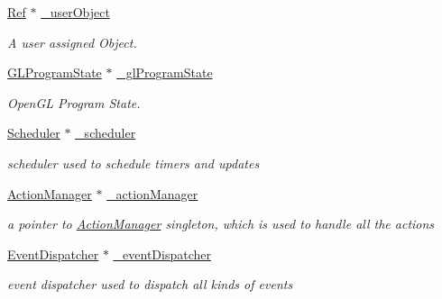 \begin{DoxyCompactItemize}
\hyperlink{classRef}{Ref} $\ast$ \hyperlink{classNode_a0c483cd6aa6c7f516b332a27c8ddffbb}{\+\_\+user\+Object}
\begin{DoxyCompactList}\small\item\em A user assigned Object. \end{DoxyCompactList}\item 
\mbox{\label{classNode_ab0b58bb6b1a8d3eaafe27bc57c120a57}} 
\hyperlink{classGLProgramState}{G\+L\+Program\+State} $\ast$ \hyperlink{classNode_ab0b58bb6b1a8d3eaafe27bc57c120a57}{\+\_\+gl\+Program\+State}
\begin{DoxyCompactList}\small\item\em Open\+GL Program State. \end{DoxyCompactList}\item 
\mbox{\label{classNode_a8fa43ad094d6b9bac26e9f0ab387f846}} 
\hyperlink{classScheduler}{Scheduler} $\ast$ \hyperlink{classNode_a8fa43ad094d6b9bac26e9f0ab387f846}{\+\_\+scheduler}
\begin{DoxyCompactList}\small\item\em scheduler used to schedule timers and updates \end{DoxyCompactList}\item 
\mbox{\label{classNode_aee98e86f00584d2c23a0e11dad4b0a1f}} 
\hyperlink{classActionManager}{Action\+Manager} $\ast$ \hyperlink{classNode_aee98e86f00584d2c23a0e11dad4b0a1f}{\+\_\+action\+Manager}
\begin{DoxyCompactList}\small\item\em a pointer to \hyperlink{classActionManager}{Action\+Manager} singleton, which is used to handle all the actions \end{DoxyCompactList}\item 
\mbox{\label{classNode_aff03fa4ef9f5bd148b264676865215fe}} 
\hyperlink{classEventDispatcher}{Event\+Dispatcher} $\ast$ \hyperlink{classNode_aff03fa4ef9f5bd148b264676865215fe}{\+\_\+event\+Dispatcher}
\begin{DoxyCompactList}\small\item\em event dispatcher used to dispatch all kinds of events \end{DoxyCompactList}\item 
\mbox{\label{classNode_aa26daeae52daea23a70c899c5361fff2}} 

\end{DoxyCompactItemize}

